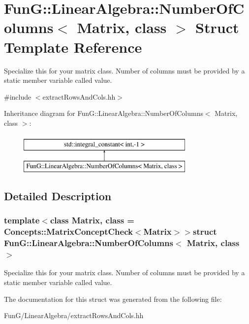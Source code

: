 \hypertarget{structFunG_1_1LinearAlgebra_1_1NumberOfColumns}{\section{Fun\-G\-:\-:Linear\-Algebra\-:\-:Number\-Of\-Columns$<$ Matrix, class $>$ Struct Template Reference}
\label{structFunG_1_1LinearAlgebra_1_1NumberOfColumns}
}


Specialize this for your matrix class. Number of columns must be provided by a static member variable called value.  




{\ttfamily \#include $<$extract\-Rows\-And\-Cols.\-hh$>$}

Inheritance diagram for Fun\-G\-:\-:Linear\-Algebra\-:\-:Number\-Of\-Columns$<$ Matrix, class $>$\-:\begin{figure}[H]
\begin{center}
\leavevmode
\includegraphics[height=2.000000cm]{structFunG_1_1LinearAlgebra_1_1NumberOfColumns}
\end{center}
\end{figure}


\subsection{Detailed Description}
\subsubsection*{template$<$class Matrix, class = Concepts\-::\-Matrix\-Concept\-Check$<$\-Matrix$>$$>$struct Fun\-G\-::\-Linear\-Algebra\-::\-Number\-Of\-Columns$<$ Matrix, class $>$}

Specialize this for your matrix class. Number of columns must be provided by a static member variable called value. 

The documentation for this struct was generated from the following file\-:\begin{DoxyCompactItemize}
\item 
Fun\-G/\-Linear\-Algebra/extract\-Rows\-And\-Cols.\-hh\end{DoxyCompactItemize}
